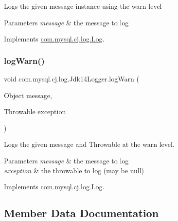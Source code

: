 Logs the given message instance using the \textquotesingle{}warn\textquotesingle{} level


\begin{DoxyParams}{Parameters}
{\em message} & the message to log \\
\hline
\end{DoxyParams}


Implements \mbox{\hyperlink{interfacecom_1_1mysql_1_1cj_1_1log_1_1_log_a3a30dcfb7f5790b79e9db64431107cfc}{com.\+mysql.\+cj.\+log.\+Log}}.

\mbox{\label{classcom_1_1mysql_1_1cj_1_1log_1_1_jdk14_logger_ae61cfdb92166273f90bec4fbbac6374c}} 
\subsubsection{\texorpdfstring{log\+Warn()}{logWarn()}\hspace{0.1cm}{\footnotesize\ttfamily [2/2]}}
{\footnotesize\ttfamily void com.\+mysql.\+cj.\+log.\+Jdk14\+Logger.\+log\+Warn (\begin{DoxyParamCaption}\item[{Object}]{message,  }\item[{Throwable}]{exception }\end{DoxyParamCaption})}

Logs the given message and Throwable at the \textquotesingle{}warn\textquotesingle{} level.


\begin{DoxyParams}{Parameters}
{\em message} & the message to log \\
\hline
{\em exception} & the throwable to log (may be null) \\
\hline
\end{DoxyParams}


Implements \mbox{\hyperlink{interfacecom_1_1mysql_1_1cj_1_1log_1_1_log_a36af866ddfdda47938c768d3d0e68572}{com.\+mysql.\+cj.\+log.\+Log}}.



\subsection{Member Data Documentation}
\mbox{\label{classcom_1_1mysql_1_1cj_1_1log_1_1_jdk14_logger_a204d9cc5608810f28a924d65f8583f5f}} 
